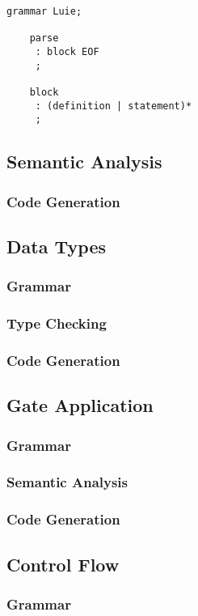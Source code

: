 \begin{lstlisting}[style=ANTLR]
    grammar Luie;
    
    parse
     : block EOF
     ;
    
    block
     : (definition | statement)*
     ;
\end{lstlisting}


\subsection{Semantic Analysis}
\subsubsection{Code Generation}

\subsection{Data Types}
\subsubsection{Grammar}
\subsubsection{Type Checking}
\subsubsection{Code Generation}

\subsection{Gate Application}
\subsubsection{Grammar}
\subsubsection{Semantic Analysis}
\subsubsection{Code Generation}

\subsection{Control Flow}
\subsubsection{Grammar}
